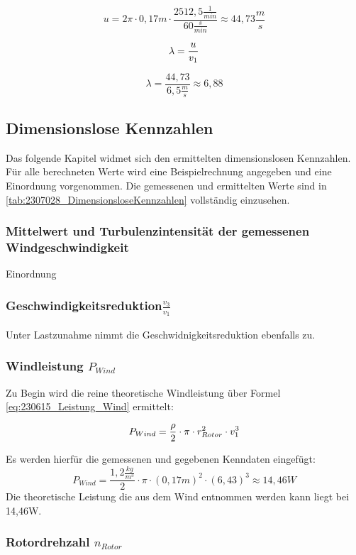 $$    u = 2 \pi \cdot 0,17m \cdot \frac{2512,5 \frac{1}{min}}{60 \frac{s}{min}}\approx 44,73\frac{m}{s} $$

\begin{equation}
    \centering
    \lambda = \frac{u}{v_1}
    \label{eq:230615_Schnelllaufzahl}
\end{equation}

$$\lambda = \frac{44,73}{6,5 \frac{m}{s}}\approx 6,88$$


\subsection{Dimensionslose Kennzahlen}
Das folgende Kapitel widmet sich den ermittelten dimensionslosen Kennzahlen.
Für alle berechneten Werte wird eine Beispielrechnung angegeben und eine Einordnung vorgenommen.
Die gemessenen und ermittelten Werte sind in \autoref{tab:2307028_DimensionsloseKennzahlen} vollständig einzusehen.
\subsubsection*{Mittelwert und Turbulenzintensität der gemessenen Windgeschwindigkeit}
Einordnung
\subsubsection*{Geschwindigkeitsreduktion$\frac{v_3}{v_1}$}
Unter Lastzunahme nimmt die Geschwidnigkeitsreduktion ebenfalls zu.
\subsubsection*{Windleistung $P_{Wind}$}
Zu Begin wird die reine theoretische Windleistung über Formel \autoref{eq:230615_Leistung_Wind} ermittelt:

\begin{equation}
    \centering
    P_{Wind} = \frac{\rho}{2} \cdot \pi \cdot r_{Rotor}^2 \cdot v_1^3
    \label{eq:230615_Leistung_Wind}
\end{equation}

Es werden hierfür die gemessenen und gegebenen Kenndaten eingefügt:
$$P_{Wind} = \frac{1,2 \frac{kg}{m^3}}{2} \cdot \pi \cdot (0,17 m)^2 \cdot (6,43)^3 \approx 14,46 W$$
Die theoretische Leistung die aus dem Wind entnommen werden kann liegt bei 14,46W.

\subsubsection*{Rotordrehzahl $n_{Rotor}$}

